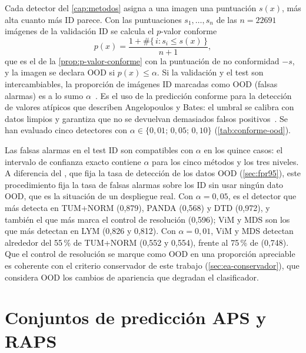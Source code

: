 Cada detector del \cref{cap:metodos} asigna a una imagen una puntuación $s(x)$, más
alta cuanto más ID parece. Con las puntuaciones $s_1,\dots,s_n$ de las
$n = \num{22691}$ imágenes de la validación ID se calcula el $p$-valor conforme
\[
  p(x) = \frac{1 + \#\{\, i : s_i \le s(x) \,\}}{n+1},
\]
que es el de la \cref{prop:p-valor-conforme} con la puntuación de no conformidad
$-s$, y la imagen se declara OOD si $p(x) \le \alpha$. Si la validación y el test
son intercambiables, la proporción de imágenes ID marcadas como OOD (falsas
alarmas) es a lo sumo $\alpha$~\cite{angelopoulos2021,vovk2022}. Es el uso de la
predicción conforme para la detección de valores atípicos que describen
Angelopoulos y Bates: el umbral se calibra con datos limpios y garantiza que no se
devuelvan demasiados falsos positivos~\cite{angelopoulos2021}. Se han evaluado
cinco detectores con $\alpha \in \{0{,}01;\, 0{,}05;\, 0{,}10\}$
(\cref{tab:conforme-ood}).



Las falsas alarmas en el test ID son compatibles con $\alpha$ en los quince casos:
el intervalo de confianza exacto contiene $\alpha$ para los cinco métodos y los tres
niveles. A diferencia del , que fija la tasa de detección de los datos OOD
(\cref{sec:fpr95}), este procedimiento fija la tasa de falsas alarmas sobre los ID
sin usar ningún dato OOD, que es la situación de un despliegue real. Con
$\alpha = 0{,}05$, \stoodx es el detector que más detecta en TUM+NORM (0,879),
PANDA (0,568) y DTD (0,972), y también el que más marca el control de resolución
(0,596); ViM y MDS son los que más detectan en LYM (0,826 y 0,812). Con
$\alpha = 0{,}01$, ViM y MDS detectan alrededor del 55\,\% de TUM+NORM (0,552 y
0,554), frente al 75\,\% de \stoodx (0,748). Que el control de resolución se
marque como OOD en una proporción apreciable es coherente con el criterio
conservador de este trabajo (\cref{sec:ea-conservador}), que considera OOD los
cambios de apariencia que degradan el clasificador.

\section{Conjuntos de predicción APS y RAPS}\label{sec:conforme-aps}

